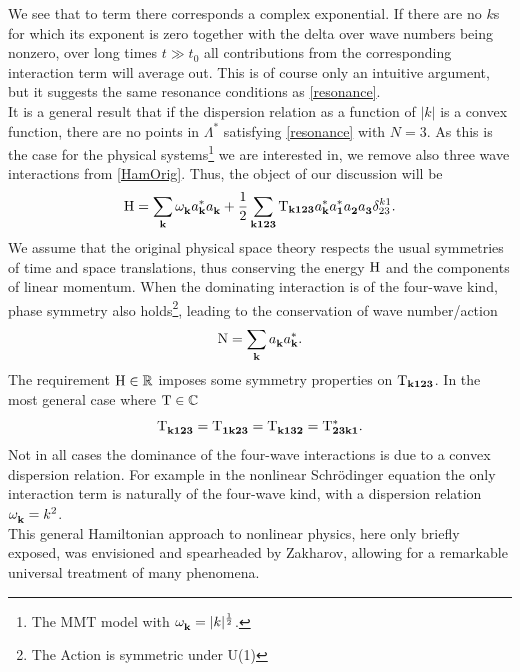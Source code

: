We see that to term there corresponds a complex exponential. If there are no $k$s for which its exponent is zero together with the delta over wave numbers being nonzero, over long times $t \gg t_0$ all contributions from the corresponding interaction term will average out. This
is of course only an intuitive argument, but it suggests the same resonance conditions as \eqref{resonance}. \\
It is a general result that if the dispersion relation as a function of $|k|$ is a convex function, there are no points in $\Lambda^*$ satisfying \eqref{resonance} with $N = 3$. As
this is the case for the physical systems\footnote{The MMT model with $\omega^{}_{\mathbf{k}} = |k|^\frac{1}{2}$.} we are interested in, we remove also three wave interactions from \eqref{HamOrig}. 
Thus, the object of our discussion will be 
\begin{equation}
    \mathrm{H} = \sum_\mathbf{k} \omega^{}_{\mathbf{k}} a_\mathbf{k}^{*} a_\mathbf{k}^{} + \frac{1}{2} \sum_{\mathbf{k123}} \mathrm{T}_{\mathbf{k123}} a_\mathbf{k}^{*} a_\mathbf{1}^{*} a_\mathbf{2}^{} a_\mathbf{3}^{} \delta_{23}^{k1}.
    \label{ham4}
\end{equation}
We assume that the original physical space theory respects the usual symmetries of time and space translations, thus conserving the energy $\mathrm{H}$ and 
the components of linear
momentum. When the dominating interaction is of the four-wave kind, phase symmetry also holds\footnote{The Action is 
symmetric under U(1)}, leading to the conservation of wave number/action
\begin{equation}
    \mathrm{N} = \sum_\mathbf{k} a_\mathbf{k}^{}a_\mathbf{k}^{*}.
\end{equation} 
The requirement $\mathrm{H}  \in \mathbb{R}$ imposes some symmetry properties on $\mathrm{T}_{\mathbf{k123}}$. In the most general case where $\mathrm{T} \in \mathbb{C}$
\begin{equation}
    \mathrm{T}^{}_\mathbf{k123} = \mathrm{T}^{}_\mathbf{1k23} = \mathrm{T}^{}_\mathbf{k132} = \mathrm{T}^*_\mathbf{23k1}.
\end{equation}
Not in all cases the dominance of the four-wave interactions is due to a convex dispersion relation. For example in the nonlinear Schrödinger equation
the only interaction term is naturally of the four-wave kind, with a dispersion relation $\omega^{}_{\mathbf{k}} = k^2$.\\ 
This general Hamiltonian approach to nonlinear physics, here only briefly exposed, was envisioned and spearheaded by Zakharov, allowing for a remarkable universal 
treatment of many phenomena. \\ 

